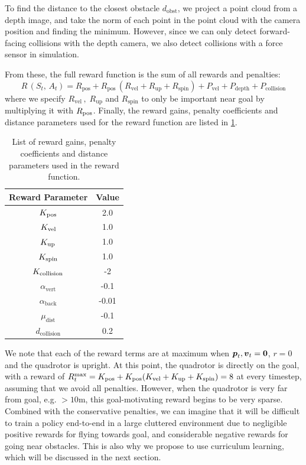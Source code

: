 To find the distance to the closest obstacle $d_\text{obst}$, we project a point cloud from a depth image, and take the norm of each point in the point cloud with the camera position and finding the minimum. However, since we can only detect forward-facing collisions with the depth camera, we also detect collisions with a force sensor in simulation. 

From these, the full reward function is the sum of all rewards and penalties:
\begin{equation}
    R\,(S_t, \,A_t) = R_{\text{pos}} + R_{\text{pos}} \, (R_{\text{vel}} + R_{\text{up}} + R_{\text{spin}}) + P_{\text{vel}} + P_{\text{depth}} + P_{\text{collision}}
\end{equation}
where we specify $R_{\text{vel}}\,,\; R_{\text{up}}$ and $R_{\text{spin}}$ to only be important near goal by multiplying it with $R_{\text{pos}}$.
Finally, the reward gains, penalty coefficients and distance parameters used for the reward function are listed in \cref{table:5_reward_parameters}.
\begin{table}[hbt]
    \centering
    \begin{tabular}{||c|c||}
    \hline
    \centering
        Reward Parameter & Value \\ \hline \hline
        $K_{\text{pos}}$ & 2.0 \\  
        $K_{\text{vel}}$ & 1.0 \\ 
        $K_{\text{up}}$ & 1.0 \\ 
        $K_{\text{spin}}$ & 1.0 \\ 
        $K_{\text{collision}}$ & -2 \\
        $\alpha_{\text{vert}}$ & -0.1 \\ 
        $\alpha_{\text{back}}$ & -0.01 \\ 
        $\mu_{\text{dist}}$ & -0.1 \\ 
        $d_{\text{collision}}$ & 0.2 \\ \hline
    \end{tabular}
    \caption{List of reward gains, penalty coefficients and distance parameters used in the reward function.}
     \label{table:5_reward_parameters}
\end{table}

We note that each of the reward terms are at maximum when ${\boldsymbol{p}}_t, {\boldsymbol{v}}_t = \boldsymbol{0}$, $r = 0$ and the quadrotor is upright. At this point, the quadrotor is directly on the goal, with a reward of $R_t^\text{max} = K_{\text{pos}} + K_{\text{pos}}(K_{\text{vel}} + K_{\text{up}} + K_{\text{spin}}) = 8$ at every timestep, assuming that we avoid all penalties. However, when the quadrotor is very far from goal, e.g. $>10$m, this goal-motivating reward begins to be very sparse. Combined with the conservative penalties, we can imagine that it will be difficult to train a policy end-to-end in a large cluttered environment due to negligible positive rewards for flying towards goal, and considerable negative rewards for going near obstacles.
This is also why we propose to use curriculum learning, which will be discussed in the next section.

